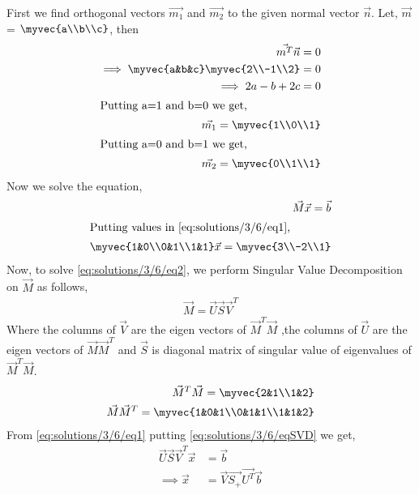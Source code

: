 First we find orthogonal vectors $\vec{m_1}$ and $\vec{m_2}$ to the given normal vector $\vec{n}$. Let, $\vec{m}$ = $\myvec{a\\b\\c}$, then
\begin{align}
\vec{m^T}\vec{n} = 0\\
\implies\myvec{a&b&c}\myvec{2\\-1\\2} = 0\\
\implies2a-b+2c = 0\\
\intertext{Putting a=1 and b=0 we get,}
\vec{m_1} = \myvec{1\\0\\1}\\
\intertext{Putting a=0 and b=1 we get,}
\vec{m_2} = \myvec{0\\1\\1}
\end{align}
Now we solve the equation,
\begin{align}
\vec{M}\vec{x} = \vec{b}
\label{eq:solutions/3/6/eq1}
\\
\intertext{Putting values in \eqref{eq:solutions/3/6/eq1},}
\myvec{1&0\\0&1\\1&1}\vec{x} = \myvec{3\\-2\\1} \label{eq:solutions/3/6/eq2}
\end{align}
Now, to solve \eqref{eq:solutions/3/6/eq2}, we perform Singular Value Decomposition on $\vec{M}$ as follows,
\begin{align}
\vec{M}=\vec{U}\vec{S}\vec{V}^T\label{eq:solutions/3/6/eqSVD}
\end{align}
Where the columns of $\vec{V}$ are the eigen vectors of $\vec{M}^T\vec{M}$ ,the columns of $\vec{U}$ are the eigen vectors of $\vec{M}\vec{M}^T$ and $\vec{S}$ is diagonal matrix of singular value of eigenvalues of $\vec{M}^T\vec{M}$.
\begin{align}
\vec{M}^T\vec{M}=\myvec{2&1\\1&2}\label{eq:solutions/3/6/eqMTM}\\
\vec{M}\vec{M}^T=\myvec{1&0&1\\0&1&1\\1&1&2}
\end{align}
From \eqref{eq:solutions/3/6/eq1} putting \eqref{eq:solutions/3/6/eqSVD} we get,
\begin{align}
\vec{U}\vec{S}\vec{V}^T\vec{x} & = \vec{b}\\
\implies\vec{x} &= \vec{V}\vec{S_+}\vec{U^T}\vec{b}\label{eq:solutions/3/6/eqX}
\end{align}
